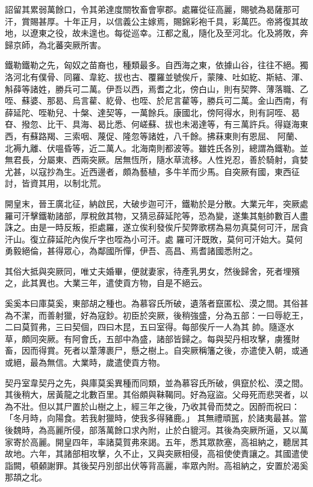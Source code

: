 \begin{pinyinscope}
 詔留其累弱萬餘口，令其弟達度關牧畜會寧郡。處羅從征高麗，賜號為曷薩那可汗，賞賜甚厚。十年正月，以信義公主嫁焉，賜錦彩袍千具，彩萬匹。帝將復其故地，以遼東之役，故未遑也。每從巡幸。江都之亂，隨化及至河北。化及將敗，奔歸京師，為北蕃突厥所害。



 鐵勒鐵勒之先，匈奴之苗裔也，種類最多。自西海之東，依據山谷，往往不絕。獨洛河北有僕骨、同羅、韋紇、拔也古、覆羅並號俟斤，蒙陳、吐如紇、斯結、渾、斛薛等諸姓，勝兵可二萬。伊吾以西，焉耆之北，傍白山，則有契弊、薄落職、乙咥、蘇婆、那曷、烏言雚、紇骨、也咥、於尼言雚等，勝兵可二萬。金山西南，有薛延陀、咥勒兒、十槃、達契等，一萬餘兵。康國北，傍阿得水，則有訶咥、曷昚、撥忽、比干、具海、曷比悉、何嵯蘇、拔也未渴達等，有三萬許兵。得嶷海東西，有蘇路羯、三索咽、蔑促、隆忽等諸姓，八千餘。拂菻東則有恩屈、
 阿蘭、北褥九離、伏嗢昏等，近二萬人。北海南則都波等。雖姓氏各別，總謂為鐵勒。並無君長，分屬東、西兩突厥。居無恆所，隨水草流移。人性兇忍，善於騎射，貪婪尤甚，以寇抄為生。近西邊者，頗為藝植，多牛羊而少馬。自突厥有國，東西征討，皆資其用，以制北荒。



 開皇末，晉王廣北征，納啟民，大破步迦可汗，鐵勒於是分散。大業元年，突厥處羅可汗擊鐵勒諸部，厚稅斂其物，又猜忌薛延陀等，恐為變，遂集其魁帥數百人盡誅之。由是一時反叛，拒處羅，遂立俟利發俟斤契弊歌楞為易勿真莫何可汗，居貪汗山。復立薛延陀內俟斤字也咥為小可汗。處
 羅可汗既敗，莫何可汗始大。莫何勇毅絕倫，甚得眾心，為鄰國所憚，伊吾、高昌、焉耆諸國悉附之。



 其俗大抵與突厥同，唯丈夫婚畢，便就妻家，待產乳男女，然後歸舍，死者埋殯之，此其異也。大業三年，遣使貢方物，自是不絕云。



 奚奚本曰庫莫奚，東部胡之種也。為慕容氏所破，遺落者竄匿松、漠之間。其俗甚為不潔，而善射獵，好為寇鈔。初臣於突厥，後稍強盛，分為五部：一曰辱紇王，二曰莫賀弗，三曰契個，四曰木昆，五曰室得。每部俟斤一人為其
 帥。隨逐水草，頗同突厥。有阿會氏，五部中為盛，諸部皆歸之。每與契丹相攻擊，虜獲財畜，因而得賞。死者以葦薄裹尸，懸之樹上。自突厥稱籓之後，亦遣使入朝，或通或絕，最為無信。大業時，歲遣使貢方物。



 契丹室韋契丹之先，與庫莫奚異種而同類，並為慕容氏所破，俱竄於松、漠之間。其後稍大，居黃龍之北數百里。其俗頗與靺鞨同。好為寇盜。父母死而悲哭者，以為不壯。但以其尸置於山樹之上，經三年之後，乃收其骨而焚之。因酹而祝曰：「冬月時，向陽食。若我射獵時，使我多得豬鹿。」
 其無禮頑嚚，於諸夷最甚。當後魏時，為高麗所侵，部落萬餘口求內附，止於白貔河。其後為突厥所逼，又以萬家寄於高麗。開皇四年，率諸莫賀弗來謁。五年，悉其眾款塞，高祖納之，聽居其故地。六年，其諸部相攻擊，久不止，又與突厥相侵，高祖使使責讓之。其國遣使詣闕，頓顙謝罪。其後契丹別部出伏等背高麗，率眾內附。高祖納之，安置於渴奚那頡之北。




\end{pinyinscope}
